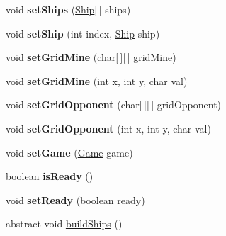 \begin{DoxyCompactItemize}
\item 
void {\bfseries set\+Ships} (\hyperlink{classShip}{Ship}\mbox{[}$\,$\mbox{]} ships)\hypertarget{classPlayer_ae4027662c9c93b5c023838a36a303a04}{}\label{classPlayer_ae4027662c9c93b5c023838a36a303a04}

\item 
void {\bfseries set\+Ship} (int index, \hyperlink{classShip}{Ship} ship)\hypertarget{classPlayer_a3235c3e8a2434947ebe9748abed80fda}{}\label{classPlayer_a3235c3e8a2434947ebe9748abed80fda}

\item 
void {\bfseries set\+Grid\+Mine} (char\mbox{[}$\,$\mbox{]}\mbox{[}$\,$\mbox{]} grid\+Mine)\hypertarget{classPlayer_affa3bbe73b17f997591a92aaf6d8da33}{}\label{classPlayer_affa3bbe73b17f997591a92aaf6d8da33}

\item 
void {\bfseries set\+Grid\+Mine} (int x, int y, char val)\hypertarget{classPlayer_a8f3ce6a037eabdb592f421b77948af27}{}\label{classPlayer_a8f3ce6a037eabdb592f421b77948af27}

\item 
void {\bfseries set\+Grid\+Opponent} (char\mbox{[}$\,$\mbox{]}\mbox{[}$\,$\mbox{]} grid\+Opponent)\hypertarget{classPlayer_a3b65aecb541790ce379f68828a24517a}{}\label{classPlayer_a3b65aecb541790ce379f68828a24517a}

\item 
void {\bfseries set\+Grid\+Opponent} (int x, int y, char val)\hypertarget{classPlayer_a9555543f75989387be2e65769fbba816}{}\label{classPlayer_a9555543f75989387be2e65769fbba816}

\item 
void {\bfseries set\+Game} (\hyperlink{classGame}{Game} game)\hypertarget{classPlayer_a75ac90ea1583ab7f6b09c48f7f414f44}{}\label{classPlayer_a75ac90ea1583ab7f6b09c48f7f414f44}

\item 
boolean {\bfseries is\+Ready} ()\hypertarget{classPlayer_a25d2009e1520e66fa0afed74111e1e7f}{}\label{classPlayer_a25d2009e1520e66fa0afed74111e1e7f}

\item 
void {\bfseries set\+Ready} (boolean ready)\hypertarget{classPlayer_a05b0f61d5105e6f759e902aa84c30630}{}\label{classPlayer_a05b0f61d5105e6f759e902aa84c30630}

\item 
abstract void \hyperlink{classPlayer_ac9db31c39141ff98362287a8bb998ef4}{build\+Ships} ()\hypertarget{classPlayer_ac9db31c39141ff98362287a8bb998ef4}{}\label{classPlayer_ac9db31c39141ff98362287a8bb998ef4}


\end{DoxyCompactItemize}
